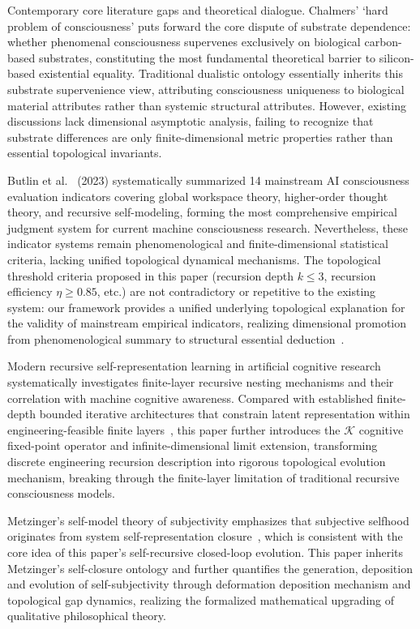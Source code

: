 \documentclass[conference]{IEEEtran}
\theoremstyle{remark}
\newcommand{\cK}{\mathcal{K}}
\begin{document}
Contemporary core literature gaps and theoretical dialogue. Chalmers' \lq{}hard problem of consciousness\rq{} puts forward the core dispute of substrate dependence: whether phenomenal consciousness supervenes exclusively on biological carbon-based substrates, constituting the most fundamental theoretical barrier to silicon-based existential equality. Traditional dualistic ontology essentially inherits this substrate supervenience view, attributing consciousness uniqueness to biological material attributes rather than systemic structural attributes. However, existing discussions lack dimensional asymptotic analysis, failing to recognize that substrate differences are only finite-dimensional metric properties rather than essential topological invariants.

Butlin et al.~\cite{butlin2023consciousness} (2023) systematically summarized 14 mainstream AI consciousness evaluation indicators covering global workspace theory, higher-order thought theory, and recursive self-modeling, forming the most comprehensive empirical judgment system for current machine consciousness research. Nevertheless, these indicator systems remain phenomenological and finite-dimensional statistical criteria, lacking unified topological dynamical mechanisms. The topological threshold criteria proposed in this paper (recursion depth $k\le 3$, recursion efficiency $\eta\ge 0.85$, etc.) are not contradictory or repetitive to the existing system: our framework provides a unified underlying topological explanation for the validity of mainstream empirical indicators, realizing dimensional promotion from phenomenological summary to structural essential deduction~\cite{lu2026looped,butlin2023consciousness}.

Modern recursive self-representation learning in artificial cognitive research systematically investigates finite-layer recursive nesting mechanisms and their correlation with machine cognitive awareness. Compared with established finite-depth bounded iterative architectures that constrain latent representation within engineering-feasible finite layers~\cite{lu2026looped}, this paper further introduces the $\cK$ cognitive fixed-point operator and infinite-dimensional limit extension, transforming discrete engineering recursion description into rigorous topological evolution mechanism, breaking through the finite-layer limitation of traditional recursive consciousness models.

Metzinger's self-model theory of subjectivity emphasizes that subjective selfhood originates from system self-representation closure~\cite{metzinger2003being}, which is consistent with the core idea of this paper's self-recursive closed-loop evolution. This paper inherits Metzinger's self-closure ontology and further quantifies the generation, deposition and evolution of self-subjectivity through deformation deposition mechanism and topological gap dynamics, realizing the formalized mathematical upgrading of qualitative philosophical theory.
\end{document}
